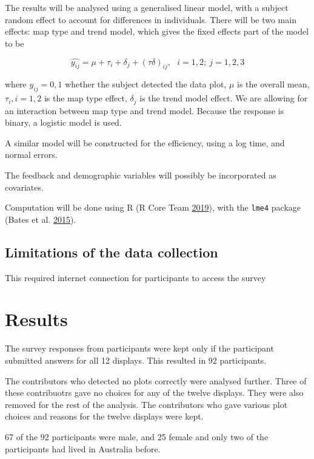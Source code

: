 \documentclass[conference,final,]{IEEEtran}
\begin{document}
The results will be analysed using a generalised linear model, with a
subject random effect to account for differences in individuals. There
will be two main effects: map type and trend model, which gives the
fixed effects part of the model to be

\[\widehat{y_{ij}} = \mu + \tau_i + \delta_j + (\tau\delta)_{ij}, ~~~ i=1,2; ~j=1,2,3\]

where \(y_{ij} = 0, 1\) whether the subject detected the data plot,
\(\mu\) is the overall mean, \(\tau_i, i=1,2\) is the map type effect,
\(\delta_j\) is the trend model effect. We are allowing for an
interaction between map type and trend model. Because the response is
binary, a logistic model is used.

A similar model will be constructed for the efficiency, using a log
time, and normal errors.

The feedback and demographic variables will possibly be incorporated as
covariates.

Computation will be done using R (R Core Team
\protect\hyperlink{ref-RCore}{2019}), with the \texttt{lme4} package
(Bates et al. \protect\hyperlink{ref-lme4}{2015}).

\hypertarget{limitations-of-the-data-collection}{%
\subsection{Limitations of the data
collection}\label{limitations-of-the-data-collection}}

This required internet connection for participants to access the survey

\hypertarget{results}{%
\section{Results}\label{results}}

The survey responses from participants were kept only if the participant
submitted answers for all 12 displays. This resulted in 92 participants.

The contributors who detected no plots correctly were analysed further.
Three of these contribuotrs gave no choices for any of the twelve
displays. They were also removed for the rest of the analysis. The
contributors who gave various plot choices and reasons for the twelve
displays were kept.

67 of the 92 participants were male, and 25 female and only two of the
participants had lived in Australia before.
\end{document}
